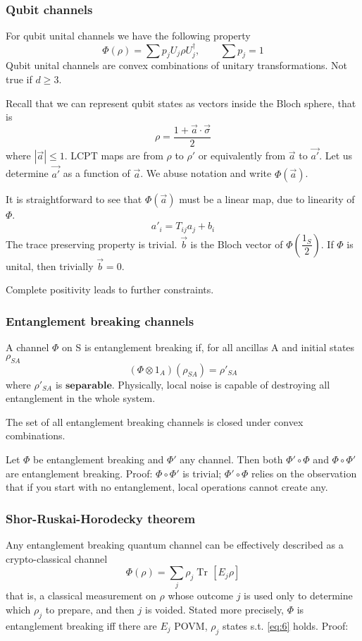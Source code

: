 \documentclass[a4paper, 11pt]{article}
\newcommand{\Tr}{\mathop{\mathrm{Tr}\!}{}}
\begin{document}
	\subsubsection{Qubit channels}
	For qubit unital channels we have the following property
	\[ \Phi(\rho) = \sum p_j U_j \rho U_j^\dagger,\qquad \sum p_j = 1 \]
	Qubit unital channels are convex combinations of unitary transformations. Not true if $d\ge 3$.
	
	Recall that we can represent qubit states as vectors inside the Bloch sphere, that is
	\[ \rho = \dfrac{1+\vec{a}\cdot\vec{\sigma}}{2} \]
	where $|\vec{a}|\le 1$. LCPT maps are from $\rho$ to $\rho'$ or equivalently from $\vec{a}$ to $\vec{a'}$.
	Let us determine $\vec{a'}$ as a function of $\vec{a}$. We abuse notation and write $\Phi(\vec{a})$.
	
	It is straightforward to see that $\Phi(\vec{a})$ must be a linear map, due to linearity of $\Phi$.
	\[ a'_i = T_{ij} a_j + b_i \]
	The trace preserving property is trivial. $\vec{b}$ is the Bloch vector of $\Phi\left(\dfrac{1_S}{2}\right)$. If $\Phi$ is unital, then trivially $\vec{b} = 0$.
	
	Complete positivity leads to further constraints.%
	
	\subsubsection{Entanglement breaking channels}
	A channel $\Phi$ on S is entanglement breaking if, for all ancillas A and initial states $\rho_{SA}$
	\[ (\Phi\otimes 1_A)(\rho_{SA}) = \rho'_{SA} \]
	where $\rho'_{SA}$ is $\mathbf{separable}$. Physically, local noise is capable of destroying all entanglement in the whole system.
	
	The set of all entanglement breaking channels is closed under convex combinations.
	
	Let $\Phi$ be entanglement breaking and $\Phi'$ any channel. Then both $\Phi'\circ \Phi$ and $\Phi\circ \Phi'$ are entanglement breaking. Proof: $\Phi\circ \Phi'$ is trivial; $\Phi'\circ \Phi$ relies on the observation that if you start with no entanglement, local operations cannot create any.
	
	\subsubsection{Shor-Ruskai-Horodecky theorem}
	Any entanglement breaking quantum channel can be effectively described as a crypto-classical channel
	\begin{equation}
	\label{eq:6}
	\Phi(\rho) = \sum_j \rho_j \Tr\left[ E_j \rho \right]
	\end{equation}
	that is, a classical measurement on $\rho$ whose outcome $j$ is used only to determine which $\rho_j$ to prepare, and then $j$ is voided. Stated more precisely, $\Phi$ is entanglement breaking iff there are $E_j$ POVM, $\rho_j$ states s.t. \ref{eq:6} holds. Proof:
	
\end{document}
